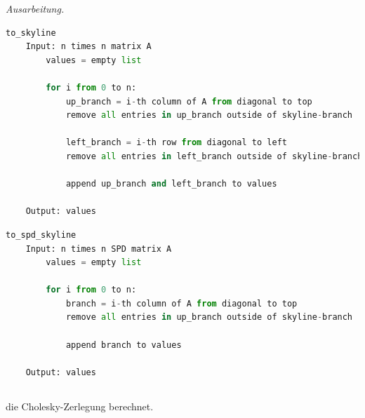 \documentclass[titlepage]{article}
\newenvironment{ausarbeitung}{\vspace{3mm}\noindent\textit{Ausarbeitung.}}{}
\begin{document}
\begin{ausarbeitung}
	\begin{samepage}
	\begin{lstlisting}[language=Python, caption=Strukturerkennung einer nicht notwendigerweise symmetrischen Skyline-Matrix]
	to_skyline
	Input: n times n matrix A
		values = empty list
	
		for i from 0 to n:
			up_branch = i-th column of A from diagonal to top
			remove all entries in up_branch outside of skyline-branch
	
			left_branch = i-th row from diagonal to left
			remove all entries in left_branch outside of skyline-branch
			
			append up_branch and left_branch to values
	
	Output: values\end{lstlisting}
	\end{samepage}
	
	\begin{samepage}
	\begin{lstlisting}[language=Python, caption=Strukturerkennung einer symmetrischen positiv definiten Skyline-Matrix]
	to_spd_skyline
	Input: n times n SPD matrix A			
		values = empty list
		
		for i from 0 to n:
			branch = i-th column of A from diagonal to top
			remove all entries in up_branch outside of skyline-branch
			
			append branch to values
		
	Output: values\end{lstlisting}
	\end{samepage}
\end{ausarbeitung}

\newpage
\subsection{}
die Cholesky-Zerlegung berechnet.
\end{document}
